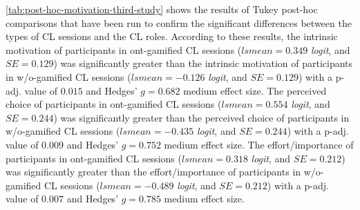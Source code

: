 {} 


\autoref{tab:post-hoc-motivation-third-study} shows the results of Tukey post-hoc comparisons that have been run to confirm the significant differences between the types of CL sessions and the CL roles.
According to these results, the intrinsic motivation of participants in ont-gamified CL sessions ($lsmean=0.349$ \emph{logit}, and $SE = 0.129$) was significantly greater than the intrinsic motivation of participants in w/o-gamified CL sessions ($lsmean=-0.126$ \emph{logit}, and $SE = 0.129$) with a p-adj. value of $0.015$ and Hedges' $g=0.682$ medium effect size.
The perceived choice of participants in ont-gamified CL sessions ($lsmean=0.554$ \emph{logit}, and $SE = 0.244$) was significantly greater than the perceived choice of participants in w/o-gamified CL sessions ($lsmean=-0.435$ \emph{logit}, and $SE = 0.244$) with a p-adj. value of $0.009$ and Hedges' $g=0.752$ medium effect size.
The effort/importance of participants in ont-gamified CL sessions ($lsmean=0.318$ \emph{logit}, and $SE = 0.212$) was significantly greater than the effort/importance of participants in w/o-gamified CL sessions ($lsmean=-0.489$ \emph{logit}, and $SE = 0.212$) with a p-adj. value of $0.007$ and Hedges' $g=0.785$ medium effect size.

